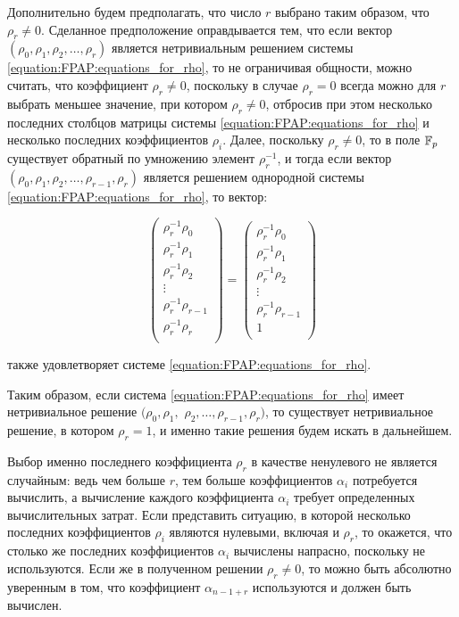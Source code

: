Дополнительно будем предполагать, что число $r$ выбрано таким образом, что $\rho_r \neq 0$. Сделанное предположение оправдывается тем, что
если вектор $(\rho_0, \rho_1, \rho_2, \dots, \rho_r)$ является нетривиальным решением системы \eqref{equation:FPAP:equations_for_rho}, то
не ограничивая общности, можно считать, что коэффициент $\rho_r \neq 0$, поскольку в случае $\rho_r = 0$ всегда можно для $r$ выбрать
меньшее значение, при котором $\rho_r \neq 0$, отбросив при этом несколько последних столбцов матрицы системы
\eqref{equation:FPAP:equations_for_rho} и несколько последних коэффициентов $\rho_i$. Далее, поскольку $\rho_r \neq 0$, то в поле $\mathbb{F}_p$
существует обратный по умножению элемент $\rho_r^{-1}$, и тогда если вектор $(\rho_0, \rho_1, \rho_2, \dots, \rho_{r-1}, \rho_r)$ является
решением однородной системы \eqref{equation:FPAP:equations_for_rho}, то вектор:

	$$
		\begin{pmatrix}
			\rho_r^{-1} \rho_0 \\
			\rho_r^{-1} \rho_1 \\
			\rho_r^{-1} \rho_2 \\
			\vdots \\
			\rho_r^{-1} \rho_{r-1} \\
			\rho_r^{-1} \rho_{r} \\
		\end{pmatrix}
		=
		\begin{pmatrix}
			\rho_r^{-1} \rho_0 \\
			\rho_r^{-1} \rho_1 \\
			\rho_r^{-1} \rho_2 \\
			\vdots \\
			\rho_r^{-1} \rho_{r-1} \\
			1 \\
		\end{pmatrix}
	$$

также удовлетворяет системе \eqref{equation:FPAP:equations_for_rho}.

Таким образом, если система \eqref{equation:FPAP:equations_for_rho}
имеет нетривиальное решение $(\rho_0, \rho_1,$ $\rho_2, \dots, \rho_{r-1}, \rho_r)$, то существует нетривиальное решение, в котором
$\rho_r = 1$, и именно такие решения будем искать в дальнейшем.

Выбор именно последнего коэффициента $\rho_r$ в качестве ненулевого не является случайным: ведь чем больше $r$, тем больше коэффициентов
$\alpha_i$ потребуется вычислить, а вычисление каждого коэффициента $\alpha_i$ требует определенных вычислительных затрат.
Если представить ситуацию, в которой несколько последних коэффициентов $\rho_i$ являются нулевыми, включая и $\rho_r$, то окажется, что
столько же последних коэффициентов $\alpha_i$ вычислены напрасно, поскольку не используются. Если же в полученном решении $\rho_r \neq 0$,
то можно быть абсолютно уверенным в том, что коэффициент $\alpha_{n-1+r}$ используются и должен быть вычислен.

